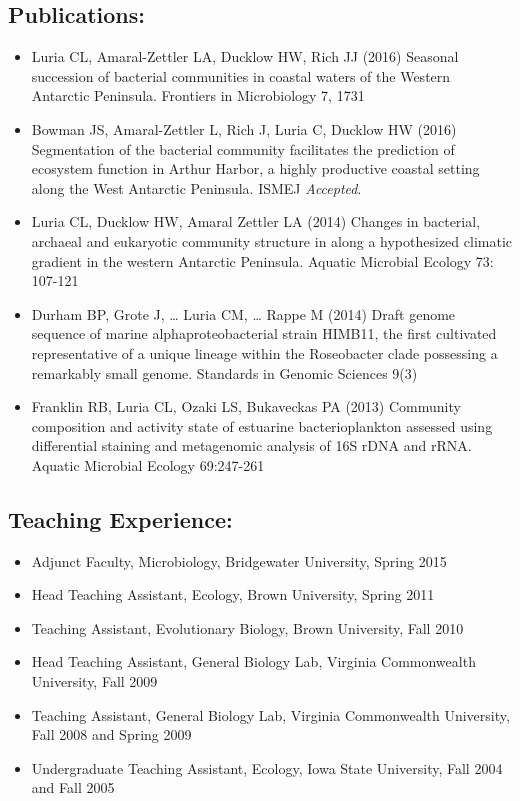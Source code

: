 \subsection*{Publications:}\label{publications}

\begin{itemize}
\tightlist
\item
  Luria CL, Amaral-Zettler LA, Ducklow HW, Rich JJ (2016) Seasonal
  succession of bacterial communities in coastal waters of the Western
  Antarctic Peninsula. Frontiers in Microbiology 7, 1731
\item
  Bowman JS, Amaral-Zettler L, Rich J, Luria C, Ducklow HW (2016)
  Segmentation of the bacterial community facilitates the prediction of
  ecosystem function in Arthur Harbor, a highly productive coastal
  setting along the West Antarctic Peninsula. ISMEJ \emph{Accepted}.
\item
  Luria CL, Ducklow HW, Amaral Zettler LA (2014) Changes in bacterial,
  archaeal and eukaryotic community structure in along a hypothesized
  climatic gradient in the western Antarctic Peninsula. Aquatic
  Microbial Ecology 73: 107-121
\item
  Durham BP, Grote J, \ldots{} Luria CM, \ldots{} Rappe M (2014) Draft
  genome sequence of marine alphaproteobacterial strain HIMB11, the
  first cultivated representative of a unique lineage within the
  Roseobacter clade possessing a remarkably small genome. Standards in
  Genomic Sciences 9(3)
\item
  Franklin RB, Luria CL, Ozaki LS, Bukaveckas PA (2013) Community
  composition and activity state of estuarine bacterioplankton assessed
  using differential staining and metagenomic analysis of 16S rDNA and
  rRNA. Aquatic Microbial Ecology 69:247-261
\end{itemize}

\subsection*{Teaching Experience:}\label{teaching-experience}

\begin{itemize}
\tightlist
\item
  Adjunct Faculty, Microbiology, Bridgewater University, Spring 2015
\item
  Head Teaching Assistant, Ecology, Brown University, Spring 2011
\item
  Teaching Assistant, Evolutionary Biology, Brown University, Fall 2010
\item
  Head Teaching Assistant, General Biology Lab, Virginia Commonwealth
  University, Fall 2009
\item
  Teaching Assistant, General Biology Lab, Virginia Commonwealth
  University, Fall 2008 and Spring 2009
\item
  Undergraduate Teaching Assistant, Ecology, Iowa State University, Fall
  2004 and Fall 2005
\end{itemize}


